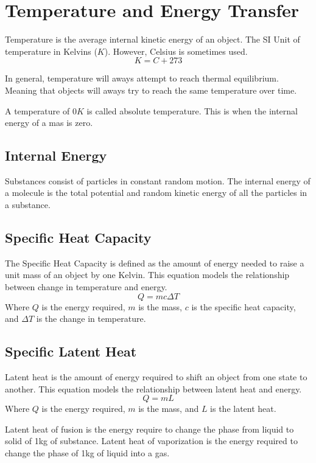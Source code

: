 \documentclass[../notes.tex]{subfiles}
\begin{document}
	
\section{Temperature and Energy Transfer}
Temperature is the average internal kinetic energy of an object.
The SI Unit of temperature in Kelvins ($K$).
However, Celsius is sometimes used.
\begin{equation}
	K = C + 273
\end{equation}

In general, temperature will aways attempt to reach thermal equilibrium.
Meaning that objects will aways try to reach the same temperature over time.

A temperature of $0 K$ is called absolute temperature. 
This is when the internal energy of a mas is zero.

\subsection{Internal Energy}
Substances consist of particles in constant random motion.
The internal energy of a molecule is the total potential and random kinetic energy of all the particles in a substance.

\subsection{Specific Heat Capacity}
The Specific Heat Capacity is defined as the amount of energy needed to raise a unit mass of an object by one Kelvin.
This equation models the relationship between change in temperature and energy.
\begin{equation}
	Q = mc\Delta T
\end{equation}
Where $Q$ is the energy required, $m$ is the mass, $c$ is the specific heat capacity, and $\Delta T$ is the change in temperature.

\subsection{Specific Latent Heat}
Latent heat is the amount of energy required to shift an object from one state to another.
This equation models the relationship between latent heat and energy.
\begin{equation}
	Q = mL
\end{equation}
Where $Q$ is the energy required, $m$ is the mass, and $L$ is the latent heat.

Latent heat of fusion is the energy require to change the phase from liquid to solid of 1kg of substance.
Latent heat of vaporization is the energy required to change the phase of 1kg of liquid into a gas.
\end{document}
